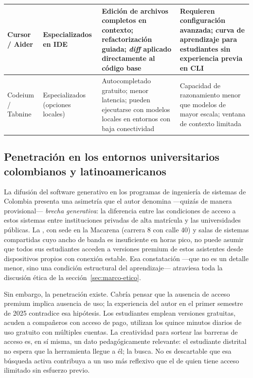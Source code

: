 \begin{longtable}{L{2.5cm} L{2cm} L{4.5cm} L{4.5cm}}
	Cursor / Aider
	& Especializados en IDE
	& Edición de archivos completos en contexto; refactorización guiada; \textit{diff} aplicado directamente al código base
	& Requieren configuración avanzada; curva de aprendizaje para estudiantes sin experiencia previa en CLI \\
	\midrule
	
	Codeium / Tabnine
	& Especializados (opciones locales)
	& Autocompletado gratuito; menor latencia; pueden ejecutarse con modelos locales en entornos con baja conectividad
	& Capacidad de razonamiento menor que modelos de mayor escala; ventana de contexto limitada \\
\end{longtable}
\endgroup

\subsection{Penetración en los entornos universitarios colombianos y latinoamericanos}
\label{subsec:penetracion-col}

La difusión del software generativo en los programas de ingeniería de sistemas
de Colombia presenta una asimetría que el autor denomina ---quizás de manera
provisional--- \emph{brecha generativa}: la diferencia entre las condiciones
de acceso a estos sistemas entre instituciones privadas de alta matrícula y las
universidades públicas. La \ud, con sede en la Macarena (carrera 8 con calle 40)
y salas de sistemas compartidas cuyo ancho de banda es insuficiente en horas
pico, no puede asumir que todos sus estudiantes acceden a versiones premium de
estos asistentes desde dispositivos propios con conexión estable. Esa
constatación ---que no es un detalle menor, sino una condición estructural del
aprendizaje--- atraviesa toda la discusión ética de la sección~\ref{sec:marco-etico}.

Sin embargo, la penetración existe. Cabría pensar que la ausencia de acceso
premium implica ausencia de uso; la experiencia del autor en el primer semestre
de 2025 contradice esa hipótesis. Los estudiantes emplean versiones gratuitas,
acuden a compañeros con acceso de pago, utilizan los quince minutos diarios
de uso gratuito con múltiples cuentas. La creatividad para sortear las barreras
de acceso es, en sí misma, un dato pedagógicamente relevante: el estudiante
distrital no espera que la herramienta llegue a él; la busca. No es descartable
que esa búsqueda activa contribuya a un uso más reflexivo que el de quien tiene
acceso ilimitado sin esfuerzo previo.

